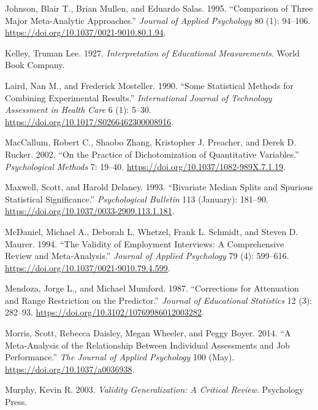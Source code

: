 \documentclass[
  letterpaper,
  DIV=11,
  numbers=noendperiod]{scrreprt}
\newlength{\cslhangindent}
\newlength{\cslentryspacingunit} %
\newenvironment{CSLReferences}[2] %
 {%
  \setlength{\parindent}{0pt}
  \ifodd #1
  \let\oldpar\par
  \def\par{\hangindent=\cslhangindent\oldpar}
  \fi
  \setlength{\parskip}{#2\cslentryspacingunit}
 }%
 {}
\begin{document}
\begin{CSLReferences}{1}{0}
\leavevmode{}%
Johnson, Blair T., Brian Mullen, and Eduardo Salas. 1995. {``Comparison
of Three Major Meta-Analytic Approaches.''} \emph{Journal of Applied
Psychology} 80 (1): 94--106.
\url{https://doi.org/10.1037/0021-9010.80.1.94}.

\leavevmode{}%
Kelley, Truman Lee. 1927. \emph{Interpretation of Educational
Measurements}. World Book Company.

\leavevmode{}%
Laird, Nan M., and Frederick Mosteller. 1990. {``Some Statistical
Methods for Combining Experimental Results.''} \emph{International
Journal of Technology Assessment in Health Care} 6 (1): 5--30.
\url{https://doi.org/10.1017/S0266462300008916}.

\leavevmode{}%
MacCallum, Robert C., Shaobo Zhang, Kristopher J. Preacher, and Derek D.
Rucker. 2002. {``On the Practice of Dichotomization of Quantitative
Variables.''} \emph{Psychological Methods} 7: 19--40.
\url{https://doi.org/10.1037/1082-989X.7.1.19}.

\leavevmode{}%
Maxwell, Scott, and Harold Delaney. 1993. {``Bivariate Median Splits and
Spurious Statistical Significance.''} \emph{Psychological Bulletin} 113
(January): 181--90. \url{https://doi.org/10.1037/0033-2909.113.1.181}.

\leavevmode{}%
McDaniel, Michael A., Deborah L. Whetzel, Frank L. Schmidt, and Steven
D. Maurer. 1994. {``The Validity of Employment Interviews: A
Comprehensive Review and Meta-Analysis.''} \emph{Journal of Applied
Psychology} 79 (4): 599--616.
\url{https://doi.org/10.1037/0021-9010.79.4.599}.

\leavevmode{}%
Mendoza, Jorge L., and Michael Mumford. 1987. {``Corrections for
Attenuation and Range Restriction on the Predictor.''} \emph{Journal of
Educational Statistics} 12 (3): 282--93.
\url{https://doi.org/10.3102/10769986012003282}.

\leavevmode{}%
Morris, Scott, Rebecca Daisley, Megan Wheeler, and Peggy Boyer. 2014.
{``A Meta-Analysis of the Relationship Between Individual Assessments
and Job Performance.''} \emph{The Journal of Applied Psychology} 100
(May). \url{https://doi.org/10.1037/a0036938}.

\leavevmode{}%
Murphy, Kevin R. 2003. \emph{Validity Generalization: A Critical
Review}. Psychology Press.


\end{CSLReferences}
\end{document}
